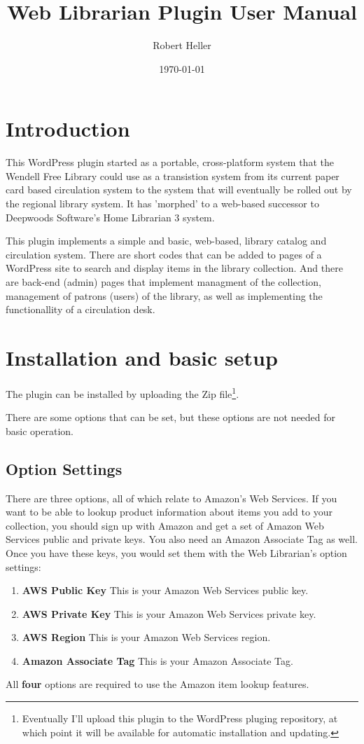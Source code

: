 \documentclass[letterpaper,twoside]{article}
\title{Web Librarian Plugin User Manual}
\author{Robert Heller}
\date{\today}
\begin{document}
\maketitle

\tableofcontents

\section{Introduction}

This WordPress plugin started as a portable, cross-platform system that
the Wendell Free Library could use as a transistion system from its current
paper card based circulation system to the system that will eventually
be rolled out by the regional library system.  It has 'morphed' to a
web-based successor to Deepwoods Software's Home Librarian 3 system.

This plugin implements a simple and basic, web-based, library catalog
and circulation system.  There are short codes that can be added to
pages of a WordPress site to search and display items in the library
collection.  And there are back-end (admin) pages that implement
managment of the collection, management of patrons (users) of the
library, as well as implementing the functionallity of a  circulation
desk. 

\section{Installation and basic setup}

The plugin can be installed by uploading the Zip
file\footnote{Eventually I'll upload this plugin to the WordPress
pluging repository, at which point it will be available for automatic
installation and updating.}.

There are some options that can be set, but these options are not needed
for basic operation.  

\subsection{Option Settings}

There are three options, all of which relate to Amazon's Web Services.
If you want to be able to lookup product information about items you
add to your collection, you should sign up with Amazon and get a set of
Amazon Web Services public and private keys.  You also need an Amazon
Associate Tag as well. Once you have these keys, you would set them
with the Web Librarian's option settings:
\begin{enumerate}
\item \textbf{AWS Public Key} This is your Amazon Web Services public key.
\item \textbf{AWS Private Key} This is your Amazon Web Services private key.
\item \textbf{AWS Region} This is your Amazon Web Services region.
\item \textbf{Amazon Associate Tag} This is your Amazon Associate Tag.
\end{enumerate}
All \textbf{four} options are required to use the Amazon item lookup features.
\end{document}
